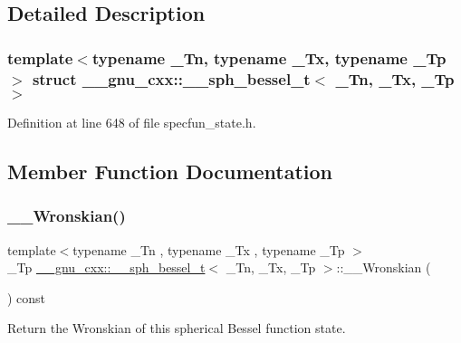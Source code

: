 \subsection{Detailed Description}
\subsubsection*{template$<$typename \+\_\+\+Tn, typename \+\_\+\+Tx, typename \+\_\+\+Tp$>$\newline
struct \+\_\+\+\_\+gnu\+\_\+cxx\+::\+\_\+\+\_\+sph\+\_\+bessel\+\_\+t$<$ \+\_\+\+Tn, \+\_\+\+Tx, \+\_\+\+Tp $>$}



Definition at line 648 of file specfun\+\_\+state.\+h.



\subsection{Member Function Documentation}
\mbox{\label{struct____gnu__cxx_1_1____sph__bessel__t_aefdc67ff4bd4b74bf6337c2a5724849b}} 
\subsubsection{\texorpdfstring{\+\_\+\+\_\+\+Wronskian()}{\_\_Wronskian()}}
{\footnotesize\ttfamily template$<$typename \+\_\+\+Tn , typename \+\_\+\+Tx , typename \+\_\+\+Tp $>$ \\
\+\_\+\+Tp \hyperlink{struct____gnu__cxx_1_1____sph__bessel__t}{\+\_\+\+\_\+gnu\+\_\+cxx\+::\+\_\+\+\_\+sph\+\_\+bessel\+\_\+t}$<$ \+\_\+\+Tn, \+\_\+\+Tx, \+\_\+\+Tp $>$\+::\+\_\+\+\_\+\+Wronskian (\begin{DoxyParamCaption}{ }\end{DoxyParamCaption}) const\hspace{0.3cm}{\ttfamily [inline]}}



Return the Wronskian of this spherical Bessel function state. 



